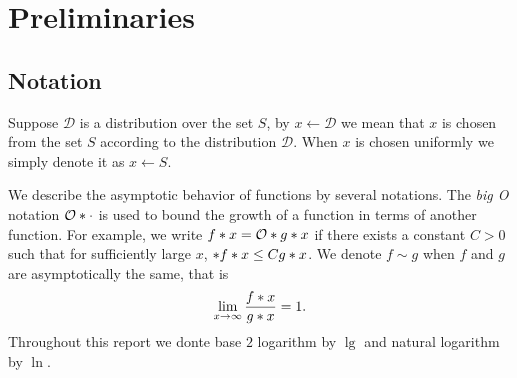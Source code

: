 \section{Preliminaries}
\subsection{Notation}
Suppose \(\mathcal{D}\) is a distribution over the set \(S\), by \(x \gets \mathcal{D}\) we mean that \(x\) is chosen from the set \(S\) according to the distribution \(\mathcal{D}\). When \(x\) is chosen uniformly we simply denote it as \(x \gets S\).

We describe the asymptotic behavior of functions by several notations. The \textit{big O} notation \(\bigO{\cdot}\) is used to bound the growth of a function in terms of another function. For example, we write \(\func{f}{x} = \bigO{\func{g}{x}}\) if there exists a constant \(C > 0\) such that for sufficiently large \(x\), \(\abs{\func{f}{x}} \leq C\func{g}{x}\). We denote \(f \sim g\) when \(f\) and \(g\) are asymptotically the same, that is 
\begin{equation}
    \lim_{x\to \infty} \dfrac{\func{f}{x}}{\func{g}{x}} = 1.
\end{equation}
Throughout this report we donte base \(2\) logarithm by \(\lg\) and natural logarithm by \(\ln\).


